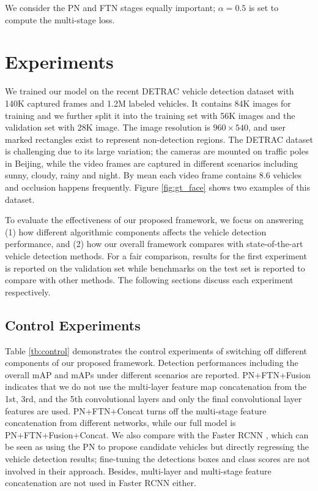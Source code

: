 \documentclass[5pt]{article}
\begin{document}
We consider the PN and FTN stages equally important; $\alpha = 0.5$ is set to compute the multi-stage loss.

\section{Experiments}
\label{sec:exp}
We trained our model on the recent DETRAC vehicle detection dataset \cite{DETRAC:CoRR:WenDCLCQLYL15} with 140K captured frames and 1.2M labeled vehicles. It contains 84K images for training and we further split it into the training set with 56K images and the validation set with 28K image. The image resolution is $960\times540$, and user marked rectangles exist to represent non-detection regions. The DETRAC dataset is challenging due to its large variation; the cameras are mounted on traffic poles in Beijing, while the video frames are captured in different scenarios including sunny, cloudy, rainy and night. By mean each video frame contains 8.6 vehicles and occlusion happens frequently. Figure \ref{fig:gt_face} shows two examples of this dataset.

To evaluate the effectiveness of our proposed framework, we focus on answering (1) how different algorithmic components affects the vehicle detection performance, and (2) how our overall framework compares with state-of-the-art vehicle detection methods.  For a fair comparison, results for the first experiment is reported on the validation set while benchmarks on the test set is reported to compare with other methods. The following sections discuss each experiment respectively.


\subsection{Control Experiments}
Table \ref{tb:control} demonstrates the control experiments of switching off different components of our proposed framework. Detection performances including the overall mAP and mAPs under different scenarios are reported. PN+FTN+Fusion indicates that we do not use the multi-layer feature map concatenation from the 1st, 3rd, and the 5th convolutional layers and only the final convolutional layer features are used. PN+FTN+Concat turns off the multi-stage feature concatenation from different networks, while our full model is PN+FTN+Fusion+Concat. We also compare with the Faster RCNN \cite{renNIPS15fasterrcnn}, which can be seen as using the PN to propose candidate vehicles but directly regressing the vehicle detection results; fine-tuning the detections boxes and class scores are not involved in their approach. Besides, multi-layer and multi-stage feature concatenation are not used in Faster RCNN either.
\end{document}
